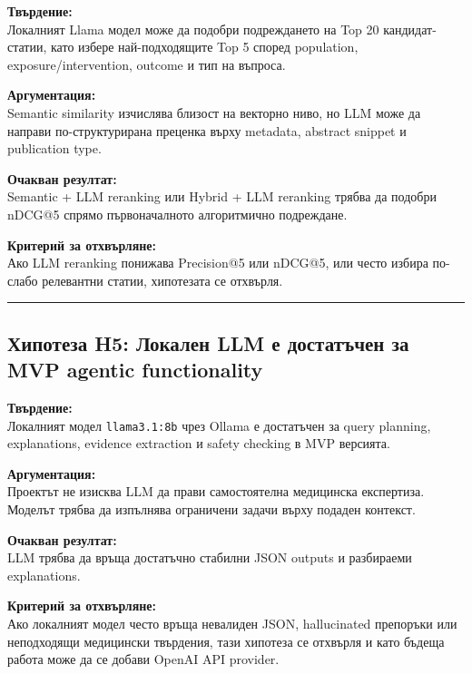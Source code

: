 \documentclass[12pt,a4paper]{article}
\begin{document}
\textbf{Твърдение:}\\
Локалният Llama модел може да подобри подреждането на Top 20 кандидат-статии, като избере най-подходящите Top 5 според population, exposure/intervention, outcome и тип на въпроса.

\textbf{Аргументация:}\\
Semantic similarity изчислява близост на векторно ниво, но LLM може да направи по-структурирана преценка върху metadata, abstract snippet и publication type.

\textbf{Очакван резултат:}\\
Semantic + LLM reranking или Hybrid + LLM reranking трябва да подобри nDCG@5 спрямо първоначалното алгоритмично подреждане.

\textbf{Критерий за отхвърляне:}\\
Ако LLM reranking понижава Precision@5 или nDCG@5, или често избира по-слабо релевантни статии, хипотезата се отхвърля.

\vspace{0.5em}\hrule\vspace{1.0em}

\subsection{Хипотеза H5: Локален LLM е достатъчен за MVP agentic functionality}\label{ux445ux438ux43fux43eux442ux435ux437ux430-h5-ux43bux43eux43aux430ux43bux435ux43d-llm-ux435-ux434ux43eux441ux442ux430ux442ux44aux447ux435ux43d-ux437ux430-mvp-agentic-functionality}

\textbf{Твърдение:}\\
Локалният модел \texttt{llama3.1:8b} чрез Ollama е достатъчен за query planning, explanations, evidence extraction и safety checking в MVP версията.

\textbf{Аргументация:}\\
Проектът не изисква LLM да прави самостоятелна медицинска експертиза. Моделът трябва да изпълнява ограничени задачи върху подаден контекст.

\textbf{Очакван резултат:}\\
LLM трябва да връща достатъчно стабилни JSON outputs и разбираеми explanations.

\textbf{Критерий за отхвърляне:}\\
Ако локалният модел често връща невалиден JSON, hallucinated препоръки или неподходящи медицински твърдения, тази хипотеза се отхвърля и като бъдеща работа може да се добави OpenAI API provider.
\end{document}
